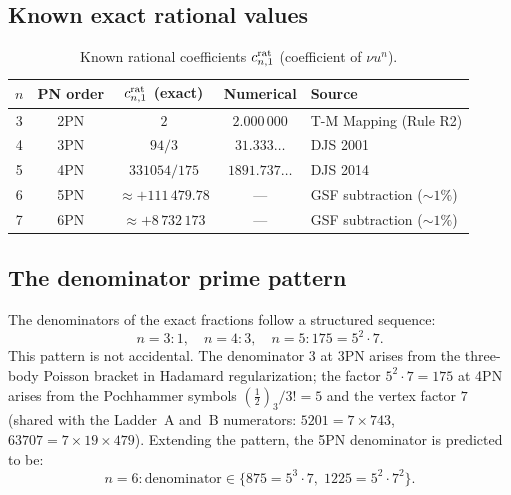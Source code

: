 \documentclass[11pt,a4paper]{article}
\theoremstyle{plain}
\theoremstyle{definition}
\theoremstyle{remark}
\begin{document}
\subsection{Known exact rational values}

\begin{table}[h]
\centering\renewcommand{\arraystretch}{1.3}
\caption{Known rational coefficients $c_{n,1}^{\rm rat}$ (coefficient of $\nu u^n$).}
\label{tab:rat_known}
\begin{tabular}{@{}ccccl@{}}
\toprule
$n$ & PN order & $c_{n,1}^{\rm rat}$ (exact) & Numerical & Source \\
\midrule
3 & 2PN & $2$ & $2.000\,000$ & T-M Mapping (Rule R2) \\
4 & 3PN & $94/3$ & $31.333\ldots$ & DJS 2001 \\
5 & 4PN & $331054/175$ & $1891.737\ldots$ & DJS 2014 \\
6 & 5PN & $\approx +111\,479.78$ & --- & GSF subtraction ($\sim 1\%$) \\
7 & 6PN & $\approx +8\,732\,173$ & --- & GSF subtraction ($\sim 1\%$) \\
\bottomrule
\end{tabular}
\end{table}

\subsection{The denominator prime pattern}

The denominators of the exact fractions follow a structured sequence:
\begin{equation}
  n=3: 1,\quad n=4: 3,\quad n=5: 175 = 5^2\cdot7.
  \label{eq:denom_pattern}
\end{equation}
This pattern is not accidental.  The denominator $3$ at 3PN arises from the
three-body Poisson bracket in Hadamard regularization; the factor $5^2\cdot7 = 175$
at 4PN arises from the Pochhammer symbols $(\tfrac{1}{2})_3/3! = 5$ and the
vertex factor $7$ (shared with the Ladder~A and~B numerators: $5201=7\times743$,
$63707=7\times19\times479$).  Extending the pattern, the 5PN denominator is
predicted to be:
\begin{equation}
  n=6: \text{denominator} \in \{875 = 5^3\cdot7,\; 1225 = 5^2\cdot7^2\}.
  \label{eq:denom_pred}
\end{equation}
\end{document}
